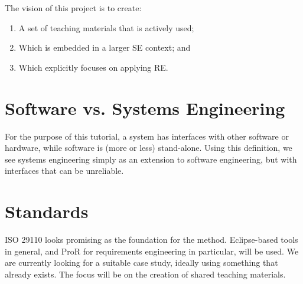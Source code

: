 The vision of this project is to create:

\begin{enumerate}
\item A set of teaching materials that is actively used; 
\item Which is embedded in a larger SE context; and
\item Which explicitly focuses on applying RE. 
\end{enumerate}




\section{Software vs. Systems Engineering}

For the purpose of this tutorial, a system has interfaces with other software or hardware, while software is (more or less) stand-alone.  Using this definition, we see systems engineering simply as an extension to software engineering, but with interfaces that can be unreliable.

\section{Standards}

ISO 29110 looks promising as the foundation for the method. Eclipse-based tools in general, and ProR for requirements engineering in particular, will be used. We are currently looking for a suitable case study, ideally using something that already exists. The focus will be on the creation of shared teaching materials. 


